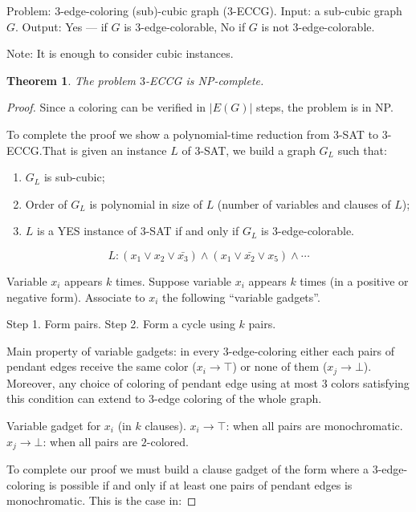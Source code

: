 \documentclass[12pt,a4paper]{article}
\newtheorem{theorem}{Theorem}
\begin{document}
Problem: \(3\)-edge-coloring (sub)-cubic graph (\(3\)-ECCG).
Input: a sub-cubic graph \(G\).
Output: Yes --- if \(G\) is \(3\)-edge-colorable, No if \(G\) is not
\(3\)-edge-colorable.

Note: It is enough to consider cubic instances.

\begin{theorem}
  The problem \(3\)-ECCG is NP-complete.
\end{theorem}

\begin{proof}
  Since a coloring can be verified in \(|E(G)|\) steps, the problem is in NP.\@

  To complete the proof we show a polynomial-time reduction from \(3\)-SAT to
  \(3\)-ECCG.\@ That is given an instance \(L\) of \(3\)-SAT, we build a graph
  \(G_L\) such that:

  \begin{enumerate}
  \item \(G_L\) is sub-cubic;
  \item Order of \(G_L\) is polynomial in size of \(L\) (number of variables and
    clauses of \(L\));
  \item \(L\) is a YES instance of \(3\)-SAT if and only if \(G_L\) is
    \(3\)-edge-colorable.
  \end{enumerate}

  \[L: (x_1 \vee x_2 \vee \bar{x_3}) \wedge (x_1 \vee \bar{x_2} \vee x_5)
    \wedge \cdots\]

  Variable \(x_i\) appears \(k\) times. Suppose variable \(x_i\) appears \(k\)
  times (in a positive or negative form).  Associate to \(x_i\) the following
  \enquote{variable gadgets}.

  Step 1. Form pairs.
  Step 2. Form a cycle using \(k\) pairs.


  Main property of variable gadgets: in every \(3\)-edge-coloring either each
  pairs of pendant edges receive the same color (\(x_i \to \top\)) or none of
  them (\(x_j \to \bot\)).  Moreover, any choice of coloring of pendant edge
  using at most \(3\) colors satisfying this condition can extend to \(3\)-edge
  coloring of the whole graph.

  Variable gadget for \(x_i\) (in \(k\) clauses).
  \(x_i \to \top\): when all pairs are monochromatic.
  \(x_j \to \bot\): when all pairs are \(2\)-colored.

  To complete our proof we must build a clause gadget of the form where a
  \(3\)-edge-coloring is possible if and only if at least one pairs of pendant
  edges is monochromatic. This is the case in:
\end{proof}
\end{document}

